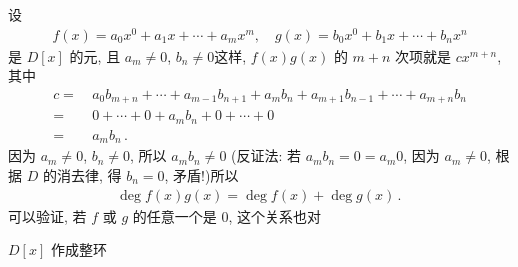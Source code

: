 \begin{remark}
    设
    \begin{align*}
        f(x) = a_0 x^0 + a_1 x + \cdots + a_m x^m, \quad g(x) = b_0 x^0 + b_1 x + \cdots + b_n x^n
    \end{align*}
    是 $D[x]$ 的元, 且 $a_m \neq 0$, $b_n \neq 0$\period 这样, $f(x)g(x)$ 的 $m+n$ 次项就是 $cx^{m+n}$, 其中
    \begin{align*}
        c
        = \  & a_0 b_{m+n} + \cdots + a_{m-1} b_{n+1} + a_m b_n + a_{m+1} b_{n-1} + \cdots + a_{m+n}b_n \\
        = \  & 0 + \cdots + 0 + a_m b_n + 0 + \cdots + 0                                                \\
        = \  & a_m b_n \period
    \end{align*}
    因为 $a_m \neq 0$, $b_n \neq 0$, 所以 $a_m b_n \neq 0$ (反证法: 若 $a_m b_n = 0 = a_m 0$, 因为 $a_m \neq 0$, 根据 $D$ 的消去律, 得 $b_n = 0$, 矛盾!)\period 所以
    \begin{align*}
        \deg f(x) g(x) = \deg f(x) + \deg g(x) \period
    \end{align*}
    可以验证, 若 $f$ 或 $g$ 的任意一个是 $0$, 这个关系也对\period
\end{remark}

\begin{proposition}
    $D[x]$ 作成整环\period
\end{proposition}

